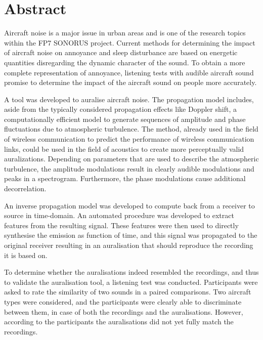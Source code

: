 \newpage\section*{Abstract}

Aircraft noise is a major issue in urban areas and is one of the research topics
within the FP7 SONORUS project. Current methods for determining the impact of
aircraft noise on annoyance and sleep disturbance are based on energetic
quantities disregarding the dynamic character of the sound. To obtain a more
complete representation of annoyance, listening tests with audible aircraft
sound promise to determine the impact of the aircraft sound on people more accurately.

A tool was developed to auralise aircraft noise. The propagation model includes,
aside from the typically considered propagation effects like Doppler shift, a
computationally efficient model to generate sequences of amplitude and phase
fluctuations due to atmospheric turbulence. The method, already used in the
field of wireless communication to predict the performance of wireless
communication links, could be used in the field of acoustics to create more
perceptually valid auralizations. Depending on parameters that are used to
describe the atmospheric turbulence, the amplitude modulations result in clearly
audible modulations and peaks in a spectrogram. Furthermore, the phase
modulations cause additional decorrelation.

An inverse propagation model was developed to compute back from a receiver to
source in time-domain. An automated procedure was developed to extract features
from the resulting signal. These features were then used to directly synthesise
the emission as function of time, and this signal was propagated to the original
receiver resulting in an auralisation that should reproduce the recording
it is based on.

To determine whether the auralisations indeed resembled the recordings, and thus
to validate the auralisation tool, a listening test was conducted. Participants
were asked to rate the similarity of two sounds in a paired comparisons. Two
aircraft types were considered, and the participants were clearly able to
discriminate between them, in case of both the recordings and the auralisations.
However, according to the participants the auralisations did not yet fully match
the recordings.





